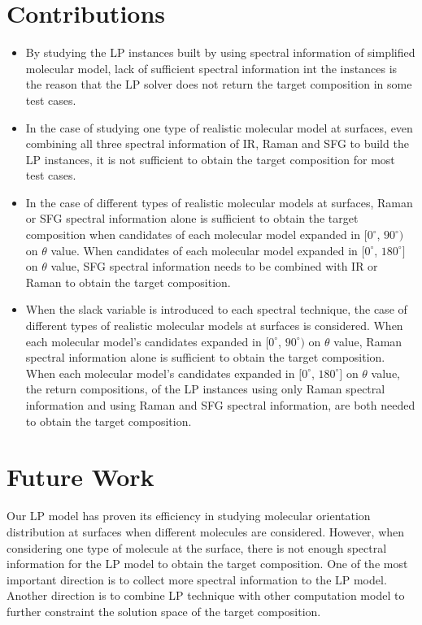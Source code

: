 \section{Contributions}
\begin{itemize}
  \item By studying the LP instances built by using spectral information of simplified molecular model, lack of sufficient spectral information int the instances is the reason that the LP solver does not return the target composition in some test cases.
  \item In the case of studying one type of realistic molecular model at surfaces, even combining all three spectral information of IR, Raman and SFG to build the LP instances, it is not sufficient to obtain the target composition for most test cases. 
  \item In the case of different types of realistic molecular models at surfaces, Raman or SFG spectral information alone is sufficient to obtain the target composition when candidates of each molecular model expanded in $[0^{\circ}$, $90^{\circ})$ on $\theta$ value. When candidates of each molecular model expanded in $[0^{\circ}$, $180^{\circ}]$ on $\theta$ value, SFG spectral information needs to be combined with IR or Raman to obtain the target composition.
  \item When the slack variable is introduced to each spectral technique, the case of different types of realistic molecular models at surfaces is considered. When each molecular model's candidates expanded in $[0^{\circ}$, $90^{\circ})$ on $\theta$ value, Raman spectral information alone is sufficient to obtain the target composition. When each molecular model's candidates expanded in $[0^{\circ}$, $180^{\circ}]$ on $\theta$ value, the return compositions, of the LP instances using only Raman spectral information and using Raman and SFG spectral information, are both needed to obtain the target composition.
\end{itemize}

\section{Future Work}
Our LP model has proven its efficiency in studying molecular orientation distribution at surfaces when different molecules are considered. However, when considering one type of molecule at the surface, there is not enough spectral information for the LP model to obtain the target composition. One of the most important direction is to collect more spectral information to the LP model. Another direction is to combine LP technique with other computation model to further constraint the solution space of the target composition.








